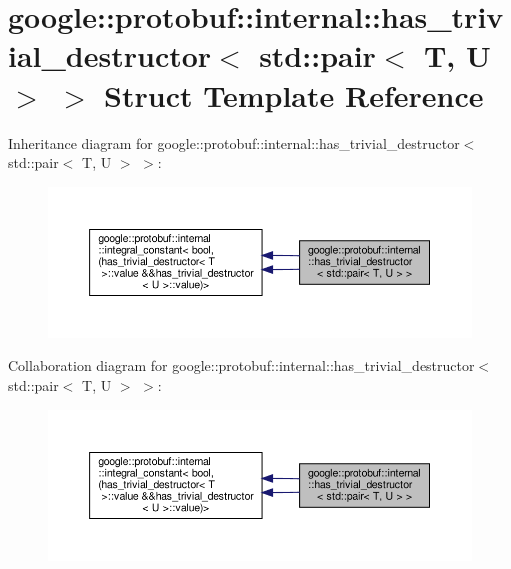 \hypertarget{structgoogle_1_1protobuf_1_1internal_1_1has__trivial__destructor_3_01std_1_1pair_3_01T_00_01U_01_4_01_4}{}\section{google\+:\+:protobuf\+:\+:internal\+:\+:has\+\_\+trivial\+\_\+destructor$<$ std\+:\+:pair$<$ T, U $>$ $>$ Struct Template Reference}
\label{structgoogle_1_1protobuf_1_1internal_1_1has__trivial__destructor_3_01std_1_1pair_3_01T_00_01U_01_4_01_4}


Inheritance diagram for google\+:\+:protobuf\+:\+:internal\+:\+:has\+\_\+trivial\+\_\+destructor$<$ std\+:\+:pair$<$ T, U $>$ $>$\+:
\nopagebreak
\begin{figure}[H]
\begin{center}
\leavevmode
\includegraphics[width=350pt]{structgoogle_1_1protobuf_1_1internal_1_1has__trivial__destructor_3_01std_1_1pair_3_01T_00_01U_01_4_01_4__inherit__graph}
\end{center}
\end{figure}


Collaboration diagram for google\+:\+:protobuf\+:\+:internal\+:\+:has\+\_\+trivial\+\_\+destructor$<$ std\+:\+:pair$<$ T, U $>$ $>$\+:
\nopagebreak
\begin{figure}[H]
\begin{center}
\leavevmode
\includegraphics[width=350pt]{structgoogle_1_1protobuf_1_1internal_1_1has__trivial__destructor_3_01std_1_1pair_3_01T_00_01U_01_4_01_4__coll__graph}
\end{center}
\end{figure}
